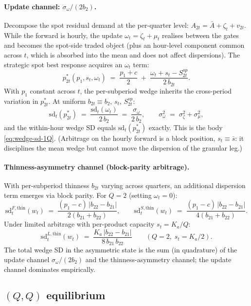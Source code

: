 \documentclass[11pt,a4paper]{article}
\theoremstyle{definition}
\theoremstyle{remark}
\theoremstyle{plain}
\begin{document}
\paragraph{Update channel: $\sigma_\omega/(2 b_2)$.} Decompose the spot residual demand at the per-quarter level: $A_{2t} = \bar A + \zeta_t + v_{2t}$. While the forward is hourly, the update $\omega_t = \zeta_t + \mu_t$ realises between the gates and becomes the spot-side traded object (plus an hour-level component common across $t$, which is absorbed into the mean and does not affect dispersions). The strategic spot best response acquires an $\omega_t$ term:
\[
p_{2t}^*(p_1, s_t, \omega_t) \;=\; \frac{p_1 + c}{2} \;+\; \frac{\omega_t + s_t - S^{op}_{2t}}{2\, b_{2t}}.
\]
With $p_1$ constant across $t$, the per-subperiod wedge inherits the cross-period variation in $p_{2t}^*$. At uniform $b_{2t} \equiv b_2$, $s_t$, $S^{op}_{2t}$:
\[
\mathrm{sd}_t(p_{2t}^*) \;=\; \frac{\mathrm{sd}_t(\omega_t)}{2\, b_2} \;=\; \frac{\sigma_\omega}{2\, b_2}, \qquad \sigma_\omega^2 \;=\; \sigma_\zeta^2 + \sigma_\mu^2,
\]
and the within-hour wedge SD equals $\mathrm{sd}_t(p_{2t}^*)$ exactly. This is the body \eqref{eq:wedge-sd-1Q}. (Arbitrage on the hourly forward is a block position, $s_t \equiv \bar s$: it disciplines the mean wedge but cannot move the dispersion of the granular leg.)

\paragraph{Thinness-asymmetry channel (block-parity arbitrage).} With per-subperiod thinness $b_{2t}$ varying across quarters, an additional dispersion term emerges via block parity. For $Q=2$ (setting $\omega_t = 0$):
\begin{equation}
\mathrm{sd}_t^{F,\text{thin}}(w_t) \;=\; \frac{(p_1 - c)\,|b_{22} - b_{21}|}{2(b_{21} + b_{22})}, \qquad
\mathrm{sd}_t^{S,\text{thin}}(w_t) \;=\; \frac{(p_1 - c)\,|b_{22} - b_{21}|}{4(b_{21} + b_{22})}.
\end{equation}
Under limited arbitrage with per-product capacity $s_t = K_a/Q$:
\[
\mathrm{sd}_t^{L,\text{thin}}(w_t) \;=\; \frac{K_a\,|b_{22} - b_{21}|}{8\, b_{21}\, b_{22}} \qquad (Q=2,\; s_t = K_a/2).
\]
The total wedge SD in the asymmetric state is the sum (in quadrature) of the update channel $\sigma_\omega/(2 b_2)$ and the thinness-asymmetry channel; the update channel dominates empirically.

\subsection{$(Q,Q)$ equilibrium}\label{sec:state-15-15-app}
\end{document}
